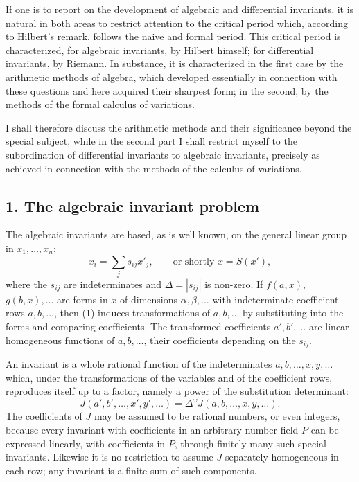 \documentclass[11pt]{article}
\begin{document}
If one is to report on the development of algebraic and differential invariants, it is natural in both areas to restrict attention to the critical period which, according to Hilbert's remark, follows the naive and formal period. This critical period is characterized, for algebraic invariants, by Hilbert himself; for differential invariants, by Riemann. In substance, it is characterized in the first case by the arithmetic methods of algebra, which developed essentially in connection with these questions and here acquired their sharpest form; in the second, by the methods of the formal calculus of variations.

I shall therefore discuss the arithmetic methods and their significance beyond the special subject, while in the second part I shall restrict myself to the subordination of differential invariants to algebraic invariants, precisely as achieved in connection with the methods of the calculus of variations.

\subsection{1. The algebraic invariant problem}

The algebraic invariants are based, as is well known, on the general linear group in $x_1,\ldots,x_n$:
\begin{equation}
  x_i=\sum_j s_{ij}x'_j, \qquad \text{or shortly } x=S(x'),          \tag{1}
\end{equation}
where the $s_{ij}$ are indeterminates and $\Delta=|s_{ij}|$ is non-zero. If $f(a,x)$, $g(b,x),\ldots$ are forms in $x$ of dimensions $\alpha,\beta,\ldots$ with indeterminate coefficient rows $a,b,\ldots$, then (1) induces transformations of $a,b,\ldots$ by substituting into the forms and comparing coefficients. The transformed coefficients $a',b',\ldots$ are linear homogeneous functions of $a,b,\ldots$, their coefficients depending on the $s_{ij}$.

An invariant is a whole rational function of the indeterminates $a,b,\ldots,x,y,\ldots$ which, under the transformations of the variables and of the coefficient rows, reproduces itself up to a factor, namely a power of the substitution determinant:
\begin{equation}
  J(a',b',\ldots,x',y',\ldots)=\Delta^\omega J(a,b,\ldots,x,y,\ldots).              \tag{3}
\end{equation}
The coefficients of $J$ may be assumed to be rational numbers, or even integers, because every invariant with coefficients in an arbitrary number field $P$ can be expressed linearly, with coefficients in $P$, through finitely many such special invariants. Likewise it is no restriction to assume $J$ separately homogeneous in each row; any invariant is a finite sum of such components.
\end{document}
